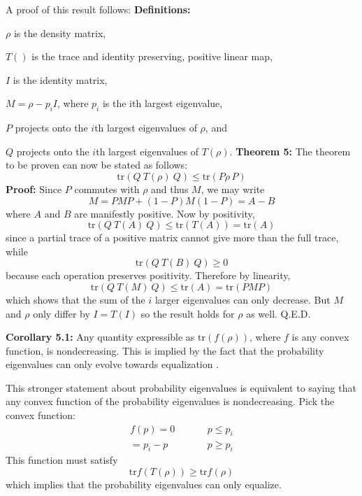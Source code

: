 \documentclass[12pt]{article}
\begin{document}
A proof of this result follows:
\newline \textbf{Definitions:}

$\rho$ is the density matrix,

$T()$ is the trace and identity preserving, positive linear map, 
 
$I$ is the identity matrix, 

$M = \rho - p_{i} I$, where $p_{i}$ is the ith largest eigenvalue, 

$P$ projects onto the $i$th largest eigenvalues of $\rho$, and 

$Q$ projects onto the $i$th largest eigenvalues of $T(\rho)$.\newline
\textbf{Theorem 5:}  The theorem to be proven can now be stated as follows:
\begin{equation}
\mathrm{tr}(Q\:T(\rho)\:Q) \le \mathrm{tr}(P \rho \, P)
\end{equation}
\textbf{Proof:} Since $P$ commutes with $\rho$ and thus $M$, we may write
\begin{equation}
M = PMP + (1-P)M(1-P) = A - B
\end{equation}
where $A$ and $B$ are manifestly positive.
Now by positivity,
\begin{equation}
\mathrm{tr}(Q\:T(A)\:Q) \le \mathrm{tr}(T(A)) = \mathrm{tr}(A)
\end{equation}
since a partial trace of a positive matrix cannot give more than  
the full trace, while
\begin{equation}
\mathrm{tr}(Q\:T(B)\:Q) \ge 0
\end{equation}
because each operation preserves positivity.
Therefore by linearity, 
\begin{equation}
\mathrm{tr}(Q\:T(M)\:Q) \le \mathrm{tr}(A) = \mathrm{tr}(PMP) \label{finalstep}
\end{equation}
which shows that the sum of the $i$ larger eigenvalues can only  
decrease.  But $M$ and $\rho$ only differ by $I = T(I)$ so the result  
holds for $\rho$ as well.  Q.E.D.

\textbf{Corollary 5.1:} Any quantity expressible as $\mathrm{tr}(f(\rho))$, where $f$ is any convex function, is nondecreasing.  This is implied by the fact that the probability eigenvalues can only evolve towards equalization \cite{Uhlmann}.

This stronger statement about probability eigenvalues is equivalent to saying that any convex function of the probability eigenvalues is nondecreasing.  Pick the convex function:
\begin{eqnarray}
         f(p) = 0 \phantom{p_i - p}          & p \le p_i \label{1st} \\ 
              = p_i - p \phantom{0}          & p \ge p_i \label{2nd}
\end{eqnarray}
This function must satisfy
\begin{equation}
\mathrm{tr} f(T(\rho)) \ge \mathrm{tr} f(\rho)
\end{equation}
which implies that the probability eigenvalues can only equalize.
\end{document}
